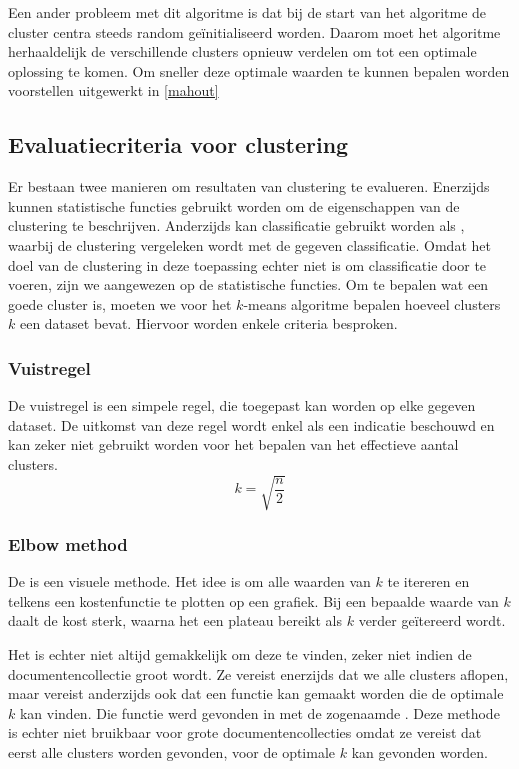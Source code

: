 Een ander probleem met dit algoritme is dat bij de start van het algoritme de cluster centra steeds random ge\"initialiseerd worden. Daarom moet het algoritme herhaaldelijk de verschillende clusters opnieuw verdelen om tot een optimale oplossing te komen. Om sneller deze optimale waarden te kunnen bepalen worden voorstellen uitgewerkt in \ref{mahout}

\subsection{Evaluatiecriteria voor clustering}\label{evaluatie-clustering}
Er bestaan twee manieren om resultaten van clustering te evalueren. Enerzijds kunnen statistische functies gebruikt worden om de eigenschappen van de clustering te beschrijven. Anderzijds kan classificatie gebruikt worden als , waarbij de clustering vergeleken wordt met de gegeven classificatie. Omdat het doel van de clustering in deze toepassing echter niet is om classificatie door te voeren, zijn we aangewezen op de statistische functies. Om te bepalen wat een goede cluster is, moeten we voor het $k$-means algoritme bepalen hoeveel clusters $k$ een dataset bevat. Hiervoor worden enkele criteria besproken.

\subsubsection{Vuistregel}
De vuistregel \cite{Science2013} is een simpele regel, die toegepast kan worden op elke gegeven dataset. De uitkomst van deze regel wordt enkel als een indicatie beschouwd en kan zeker niet gebruikt worden voor het bepalen van het effectieve aantal clusters. 
\begin{equation}
k = \sqrt{\frac{n}{2}}
\end{equation}

\subsubsection{Elbow method}
De  \cite{Science2013} is een visuele methode. Het idee is om alle waarden van $k$ te itereren en telkens een kostenfunctie te plotten op een grafiek. Bij een bepaalde waarde van $k$ daalt de kost sterk, waarna het een plateau bereikt als $k$ verder ge\"itereerd wordt. 

Het is echter niet altijd gemakkelijk om deze  te vinden, zeker niet indien de documentencollectie groot wordt. Ze vereist enerzijds dat we alle clusters aflopen, maar vereist anderzijds ook dat een functie kan gemaakt worden die de optimale $k$ kan vinden. Die functie werd gevonden in \cite{Tibshirani2001} met de zogenaamde . Deze methode is echter niet bruikbaar voor grote documentencollecties omdat ze vereist dat eerst alle clusters worden gevonden, voor de optimale $k$ kan gevonden worden. 

